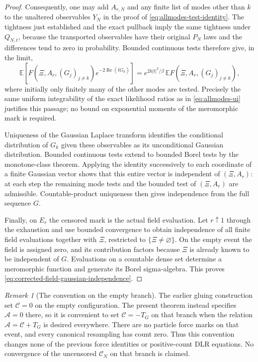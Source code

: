 \documentclass[11pt,a4paper]{article}
\numberwithin{equation}{section}
\theoremstyle{definition}
\theoremstyle{remark}
\newtheorem{remark}[theorem]{Remark}
\begin{document}
\begin{proof}
Consequently, one may add $A_{r,N}$ and any finite list of modes
other than $k$ to the unaltered observables $Y_N$ in the proof of
\eqref{eq:allmodes-test-identity}. The tightness just established and
the exact pullback imply the same tightness under $Q_{N,t}$, because
the transported observables have their original $P_N$ laws and the
differences tend to zero in probability. Bounded continuous tests
therefore give, in the limit,
\begin{equation}\label{eq:corrected-field-mode-laplace-identity}
 \mathbb E\left[F(\Xi,A_r,(G_j)_{j\ne k})
                     e^{-2\operatorname{Re}(\overline tG_k)}\right]
 =e^{2k|t|^2/\beta}\,\mathbb EF(\Xi,A_r,(G_j)_{j\ne k}),
\end{equation}
where initially only finitely many of the other modes are tested.
Precisely the same uniform integrability of the exact likelihood
ratios as in \eqref{eq:allmodes-ui} justifies this passage; no bound
on exponential moments of the meromorphic mark is required.

Uniqueness of the Gaussian Laplace transform identifies the
conditional distribution of $G_k$ given these observables as its
unconditional Gaussian distribution. Bounded continuous tests extend
to bounded Borel tests by the monotone-class theorem. Applying the
identity successively to each coordinate of a finite Gaussian vector
shows that this entire vector is independent of $(\Xi,A_r)$: at
each step the remaining mode tests and the bounded test of
$(\Xi,A_r)$ are admissible. Countable-product uniqueness then gives
independence from the full sequence $G$.

Finally, on $E_r$ the censored mark is the actual field evaluation.
Let $r\uparrow1$ through the exhaustion and use bounded convergence
to obtain independence of all finite field evaluations together with
$\Xi$, restricted to $\{\Xi\ne\varnothing\}$. On the empty event
the field is assigned zero, and its contribution factors because
$\Xi$ is already known to be independent of $G$.
Evaluations on a countable dense set determine a meromorphic function
and generate its Borel sigma-algebra. This proves
\eqref{eq:corrected-field-gaussian-independence}.
\end{proof}

\begin{remark}[The convention on the empty branch]
The earlier gluing construction set $\mathcal C=0$ on the empty
configuration. The present theorem instead specifies $\mathcal A=0$
there, so it is convenient to set $\mathcal C=-T_G$ on that branch
when the relation $\mathcal A=\mathcal C+T_G$ is desired everywhere.
There are no particle force marks on that event, and every canonical
resampling has count zero. Thus this convention changes none of the
previous force identities or positive-count DLR equations. No
convergence of the uncensored $\mathcal C_N$ on that branch is claimed.
\end{remark}
\end{document}
